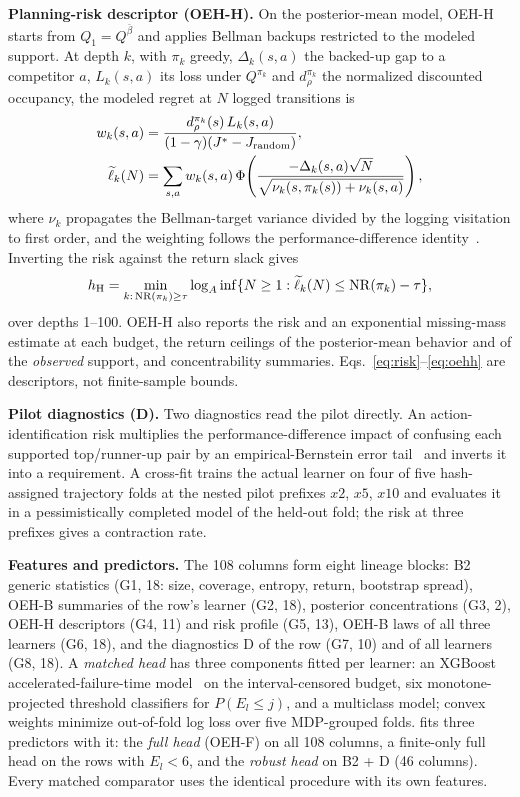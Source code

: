\textbf{Planning-risk descriptor (OEH-H).} On the posterior-mean model, OEH-H starts from $Q_1=Q^{\bar\beta}$ and applies Bellman backups restricted to the modeled support. At depth $k$, with $\pi_k$ greedy, $\Delta_k(s,a)$ the backed-up gap to a competitor $a$, $L_k(s,a)$ its loss under $Q^{\pi_k}$ and $d^{\pi_k}_\rho$ the normalized discounted occupancy, the modeled regret at $N$ logged transitions is
\begin{equation}
\begin{aligned}
w_k(s,a)&=\frac{d^{\pi_k}_\rho(s)\,L_k(s,a)}{(1-\gamma)(J^*-J_{\rm random})},\\
\widetilde\ell_k(N)&=\sum_{s,a}w_k(s,a)\,
\Phi\!\left(\frac{-\Delta_k(s,a)\sqrt N}{\sqrt{\nu_k(s,\pi_k(s))+\nu_k(s,a)}}\right),
\end{aligned}
\label{eq:risk}
\end{equation}
where $\nu_k$ propagates the Bellman-target variance divided by the logging visitation to first order, and the weighting follows the performance-difference identity~\cite{kakade2002approximately}. Inverting the risk against the return slack gives
\begin{equation}
h_{\rm H}=\min_{k:\,\mathrm{NR}(\pi_k)\ge\tau}\log_A\inf\{N\ge1:\widetilde\ell_k(N)\le\mathrm{NR}(\pi_k)-\tau\},
\label{eq:oehh}
\end{equation}
over depths 1--100. OEH-H also reports the risk and an exponential missing-mass estimate at each budget, the return ceilings of the posterior-mean behavior and of the \emph{observed} support, and concentrability summaries. Eqs.~\eqref{eq:risk}--\eqref{eq:oehh} are descriptors, not finite-sample bounds.

\textbf{Pilot diagnostics (D).} Two diagnostics read the pilot directly. An action-identification risk multiplies the performance-difference impact of confusing each supported top/runner-up pair by an empirical-Bernstein error tail~\cite{maurer2009empirical} and inverts it into a requirement. A cross-fit trains the actual learner on four of five hash-assigned trajectory folds at the nested pilot prefixes $x2$, $x5$, $x10$ and evaluates it in a pessimistically completed model of the held-out fold; the risk at three prefixes gives a contraction rate.

\textbf{Features and predictors.} The 108 columns form eight lineage blocks: B2 generic statistics (G1, 18: size, coverage, entropy, return, bootstrap spread), OEH-B summaries of the row's learner (G2, 18), posterior concentrations (G3, 2), OEH-H descriptors (G4, 11) and risk profile (G5, 13), OEH-B laws of all three learners (G6, 18), and the diagnostics D of the row (G7, 10) and of all learners (G8, 18). A \emph{matched head} has three components fitted per learner: an XGBoost accelerated-failure-time model~\cite{barnwal2022aft} on the interval-censored budget, six monotone-projected threshold classifiers for $P(E_l\le j)$, and a multiclass model; convex weights minimize out-of-fold log loss over five MDP-grouped folds. \OEH{} fits three predictors with it: the \emph{full head} (OEH-F) on all 108 columns, a finite-only full head on the rows with $E_l<6$, and the \emph{robust head} on B2 + D (46 columns). Every matched comparator uses the identical procedure with its own features.

